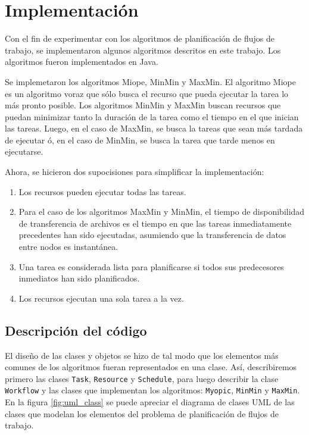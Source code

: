 \chapter{Implementación}

Con el fin de experimentar con los algoritmos de planificación de flujos de trabajo, se implementaron algunos algoritmos descritos en este trabajo. Los algoritmos fueron implementados en Java.

Se implemetaron los algoritmos Miope, MinMin y MaxMin. El algoritmo Miope es un algoritmo voraz que sólo busca el recurso que pueda ejecutar la tarea lo más pronto posible. Los algoritmos MinMin y MaxMin buscan recursos que puedan minimizar tanto la duración de la tarea como el tiempo en el que inician las tareas. Luego, en el caso de MaxMin, se busca la tareas que sean más tardada de ejecutar ó, en el caso de MinMin, se busca la tarea que tarde menos en ejecutarse.

Ahora, se hicieron dos supocisiones para simplificar la implementación:

\begin{enumerate}
\item Los recursos pueden ejecutar todas las tareas.
\item Para el caso de los algoritmos MaxMin y MinMin, el tiempo de disponibilidad de transferencia de archivos es el tiempo en que las tareas inmediatamente precedentes han sido ejecutadas, asumiendo que la transferencia de datos entre nodos es instantánea.
\item Una tarea es considerada lista para planificarse si todos sus predecesores inmediatos han sido planificados.
\item Los recursos ejecutan una sola tarea a la vez.
\end{enumerate}

\section{Descripción del código}
El diseño de las clases y objetos se hizo de tal modo que los elementos más comunes de los algoritmos fueran representados en una clase. Así, describiremos primero las clases \texttt{Task}, \texttt{Resource} y \texttt{Schedule}, para luego describir la clase \texttt{Workflow} y las clases que implementan los algoritmos: \texttt{Myopic}, \texttt{MinMin} y \texttt{MaxMin}. En la figura \ref{fig:uml_class} se puede apreciar el diagrama de clases UML de las clases que modelan los elementos del problema de planificación de flujos de trabajo.

